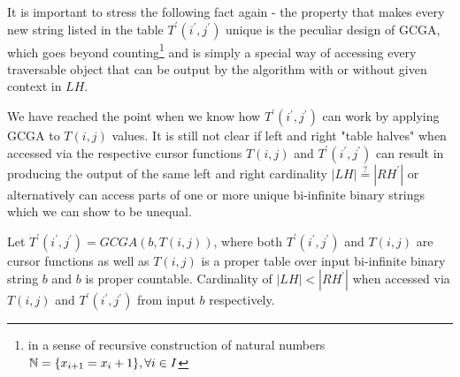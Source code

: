 It is important to stress the following fact again - the property that makes every new string listed in the table $T^\prime(i^\prime,j^\prime)$ unique is the peculiar design of GCGA, which goes beyond counting\footnote{in a sense of recursive construction of natural numbers $\mathbb{N} = \{x_{i+1} = x_{i} + 1\}, \forall i \in I$} and is simply a special way of accessing every traversable object that can be output by the algorithm with or without given context in $LH$.


We have reached the point when we know how $T^\prime(i^\prime,j^\prime)$ can work by applying GCGA to $T(i,j)$ values. It is still not clear if left and right "table halves" when accessed via the respective cursor functions $T(i,j)$ and $T^\prime(i^\prime,j^\prime)$ can result in producing the output of the same left and right cardinality $|LH| \stackrel{?}{=} |RH^\prime|$ or alternatively can access parts of one or more unique bi-infinite binary strings which we can show to be unequal.


\begin{theorem}
  Let $T^\prime(i^\prime,j^\prime) = GCGA(b, T(i,j))$, where both $T^\prime(i^\prime,j^\prime)$ and $T(i,j)$ are cursor functions as well as $T(i,j)$ is a proper table over input bi-infinite binary string $b$ and $b$ is proper countable. Cardinality of $|LH| < |RH^\prime|$ when accessed via $T(i,j)$ and $T^\prime(i^\prime,j^\prime)$ from input $b$ respectively.
\end{theorem}

